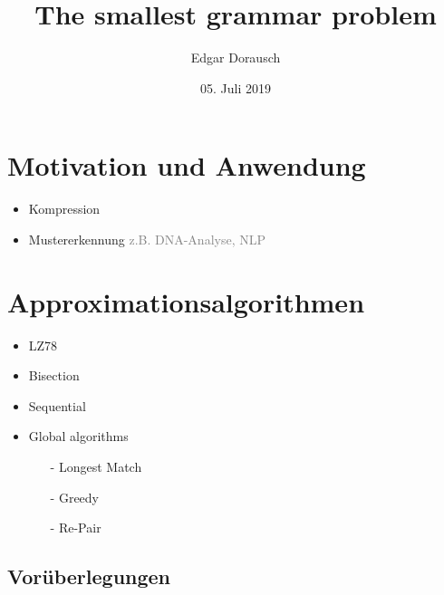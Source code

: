 \documentclass[xcolor=dvipsnames]{beamer}
\title{The smallest grammar problem}
\date{05. Juli 2019}
\author{Edgar Dorausch}
\begin{document}
\maketitle


\newcommand{\SubItem}[1]{
  \setlength\itemindent{15pt} \item[-] #1
}
\newcommand{\Gap}{$ $ \linebreak}
\newcommand{\FrameName}{
	\ifthenelse{\equal{\subsecname}{}}{
		\secname
	}{
		\secname \thinspace -\thinspace\subsecname
	}
}

\newcommand{\Fresh}{\ddagger}
\newcommand{\Hint}[1]{\textcolor{gray}{#1}}

\newcommand{\PDFC}[1]{
	\ifthenelse{\boolean{WithComments}}{
		\pdfcomment[color=red,icon=Note]{#1}
	}{
	}
}

\section{Motivation und Anwendung}

\begin{frame}{\FrameName}
	\begin{itemize}[<+->]
		\item Kompression
		\item Mustererkennung \linebreak
		\Hint{z.B. DNA-Analyse, NLP}
	\end{itemize}
\end{frame}





\section{Approximationsalgorithmen}

\begin{frame}{\FrameName}
	\begin{itemize}[<+->]
		\item LZ78
		\item Bisection 
		\item Sequential
		\item Global algorithms
		\begin{itemize}
			\item[-] Longest Match
			\item[-] Greedy
			\item[-] Re-Pair
		\end{itemize}
	\end{itemize}
\end{frame}

\subsection{Vorüberlegungen}

\newcommand{\LowerBound}{\textcolor{TealBlue}{f_l(n)}}
\newcommand{\UpperBound}{\textcolor{Salmon}{f_u(n)}}








\end{document}
